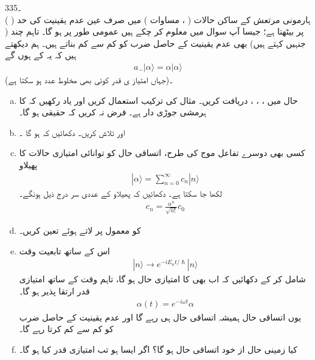 3۔35\\
 \quad ہارمونی مرتعش کے ساکن حالات ( ، مساوات ) میں صرف  عین عدم یقینیت کی
 حد ( ) پر بیٹھتا ہے؛ جیسا آپ سوال  میں معلوم کر چکے ہیں عمومی طور پر  ہو گا۔ تاہم چند  ( جنہیں کہتے ہیں) بھی عدم یقینیت کے حاصل ضرب کو کم سے کم بناتے ہیں۔ ہم دیکھتے ہیں کہ یہ  کے  ہوں گے
\begin{align*}
a_{-}|\alpha\rangle =\alpha|\alpha\rangle
\end{align*}
(جہاں امتیاز ی قدر  کوئی بھی مخلوط عدد ہو سکتا ہے)۔
\begin{enumerate}[a.] 
\item
حال  میں  ،  ،  ،  دریافت کریں۔  مثال  کی ترکیب استعمال کریں اور یاد رکھیں کہ  کا ہرمشی جوڑی دار  ہے۔ فرض نہ کریں کہ  حقیقی ہو گا۔ 
\item
{} اور  تلاش کریں۔ دکھائیں کہ  ہو گا ۔ 
\item
کسی بھی دوسرے تفاعل موج کی طرح، اتساقی حال کو توانائی امتیازی حالات کا پھیلاو 
 \begin{align*} 
|\alpha\rangle=\sum_{n=0}^{\infty}c_{n}|n\rangle 
 \end{align*} 
 لکھا جا سکتا ہے۔ دکھائیں کہ پھیلاو کے عددی سر درج ذیل ہونگے۔ 
 \begin{align*} 
c_{n}=\frac{\alpha^{n}}{\sqrt{n!}}c_{0} 
 \end{align*} 
\item
  کو معمول پر لاتے ہوئے  تعین کریں۔  
 \item
 اس کے ساتھ تابعیت وقت 
 \begin{align*} 
|n\rangle\to e^{-iE_{n}t/\hslash}|n\rangle 
 \end{align*} 
شامل کر کے دکھائیں کہ  اب بھی  کا امتیازی حال ہو گا، تاہم وقت کے ساتھ امتیازی قدر ارتقا پذیر ہو گا۔ 
 \begin{align*} 
\alpha(t)=e^{-i\omega t}\alpha 
 \end{align*} 
یوں اتساقی حال ہمیشہ اتساقی حال ہی رہے گا اور عدم یقینیت کے حاصل ضرب کو کم سے کم کرتا رہے گا۔ 
\item
کیا زمینی حال  از خود اتساقی حال ہو گا؟ اگر ایسا ہو تب امتیازی قدر کیا ہو گا۔
\end{enumerate}

